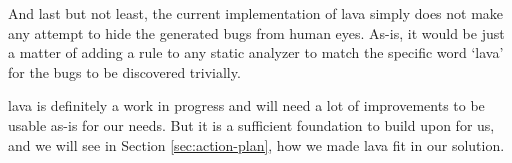 And last but not least, the current implementation of \gls{lava} simply does not make any attempt to hide the generated bugs from human eyes. As-is, it would be just a matter of adding a rule to any static analyzer to match the specific word `lava' for the bugs to be discovered trivially.

\gls{lava} is definitely a work in progress and will need a lot of improvements to be usable as-is for our needs. But it is a sufficient foundation to build upon for us, and we will see in Section \ref{sec:action-plan}, how we made \gls{lava} fit in our solution.
